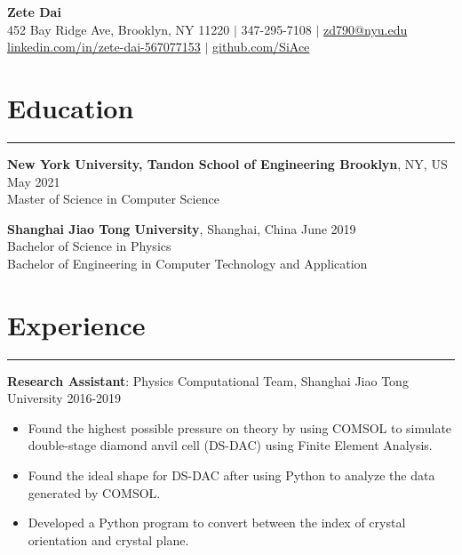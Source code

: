 \documentclass{article}
\begin{document}

\begin{center}
  {\Large\textbf{Zete Dai}} \\
  452 Bay Ridge Ave, Brooklyn, NY 11220 $|$
  347-295-7108 $|$
  \href{mailto:zd790@nyu.edu}{zd790@nyu.edu} \\
  \href{https://www.linkedin.com/in/zete-dai-567077153/}{linkedin.com/in/zete-dai-567077153} $|$
  \href{https://github.com/SiAce}{github.com/SiAce}
  
\end{center}

\section{Education}
\hrule
\vspace{1em}

\textbf{New York University, Tandon School of Engineering Brooklyn}, NY, US \hfill
May 2021 \\
Master of Science in Computer Science

\vspace{1em}

\textbf{Shanghai Jiao Tong University}, Shanghai, China \hfill
June 2019 \\
Bachelor of Science in Physics \\
Bachelor of Engineering in Computer Technology and Application

\section{Experience}
\hrule
\vspace{1em}

\textbf{Research Assistant}: Physics Computational Team, Shanghai Jiao Tong University \hfill
2016-2019

\begin{itemize}[nosep]
	\item Found the highest possible pressure on theory by using COMSOL to simulate double-stage diamond anvil cell
	(DS-DAC) using Finite Element Analysis.
	\item Found the ideal shape for DS-DAC after using Python to analyze the data generated by COMSOL.
	\item Developed a Python program to convert between the index of crystal orientation and crystal plane.
\end{itemize}

\vspace{1em}
\end{document}
